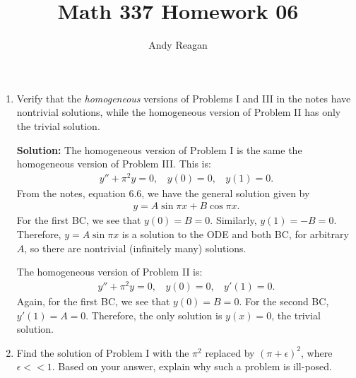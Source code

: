 \documentclass[11pt]{article}
\author{Andy Reagan}
\title{Math 337 Homework 06}
\begin{document}
\maketitle

\begin{enumerate}

\item Verify that the {\em homogeneous} versions of Problems I and III in the notes have nontrivial solutions, while the homogeneous version of Problem II has only the trivial solution.

\bigskip
\textbf{Solution:} The homogeneous version of Problem I is the same the homogeneous version of Problem III. This is:
\begin{align*} y'' + \pi ^2 y = 0, ~~~~y(0) = 0, ~~~~y(1) = 0. \end{align*}
From the notes, equation 6.6, we have the general solution given by 
\begin{align*} y = A \sin \pi x + B\cos \pi x. \end{align*}
For the first BC, we see that $y(0) = B = 0$.
Similarly, $y(1) = -B = 0$.
Therefore, $y = A \sin \pi x$ is a solution to the ODE and both BC, for arbitrary $A$, so there are nontrivial (infinitely many) solutions.

The homogeneous version of Problem II is:
\begin{align*} y'' + \pi ^2 y = 0, ~~~~y(0) = 0, ~~~~y'(1) = 0. \end{align*}
Again, for the first BC, we see that $y(0) = B = 0$.
For the second BC, $y'(1) = A = 0$.
Therefore, the only solution is $y(x) = 0$, the trivial solution.


\bigskip
\item Find the solution of Problem I with the $\pi ^2$ replaced by $(\pi + \epsilon)^2$, where $\epsilon << 1$.
Based on your answer, explain why such a problem is ill-posed.



\end{enumerate}
\end{document}
